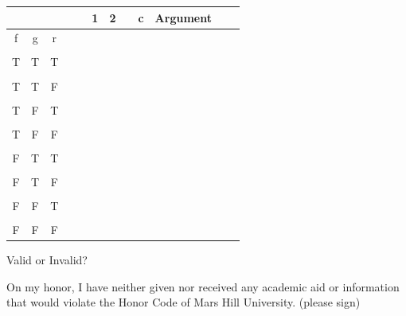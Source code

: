 \documentclass[12pt]{article}
\begin{document}
\begin{enumerate}
\noindent \begin{tabular}{|c|c|c|c|c|c|c|c|c|c|c|c|}
 & &  & & & 1&2& &c&\textrm{Argument}\\
\hline
f & g & r  & & & & & & &\\
\hline
 \qquad \qquad &  \qquad \qquad& \qquad \qquad&  \qquad \qquad&  \qquad \qquad&  \qquad \qquad\qquad &\qquad\qquad \qquad&\qquad\qquad \qquad&\qquad \qquad\qquad&\qquad \qquad\qquad\\
T & T& T& & & & & & & \\
\hline
& & & & & & & & & \\
T &T &F & & & & & & &\\
\hline
& & & & & & & & & \\
T &F &T & & & & & & & \\
\hline
& & & & & & & & &\\
T &F &F & & & & & & &\\
\hline
& & & & & & & & &  \\
F &T &T & & & & & &   &\\
\hline
& & & & & & & & & \\
 F&T & F& & & & & &  &\\
\hline
& & & & & & & &&\\
F &F &T & & & & &  & &\\
\hline
& & & & & & & & & \\
 F&F &F & & & & & &  &\\
\hline
\end{tabular}

\vspace{.4 in}

Valid or Invalid?\underline{\hspace{1.5 in}}


\vspace{1.0 in}
On my honor, I have neither given nor received any academic aid or information that would violate the Honor Code of Mars Hill University. \underline{\hspace{2.0 in}} (please sign)
\end{enumerate}
\end{document}
